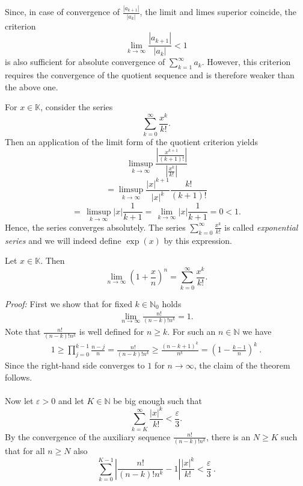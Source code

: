\begin{Remark}{}
Since, in case of convergence of $\frac{|a_{k+1}|}{|a_{k}|}$, the limit and limes superior coincide, the criterion
\[\lim_{k\to\infty}\frac{|a_{k+1}|}{|a_{k}|}<1\]
is also sufficient for absolute convergence of $\sum_{k=1}^\infty a_k$. However, this criterion requires the convergence of the quotient sequence and is therefore weaker than the above one.
\end{Remark}


\begin{example}\label{ex:expser}
 For $x\in\mathbb{K}$, consider the series
\[\sum_{k=0}^\infty\frac{x^k}{k!}.\]
Then an application of the limit form of the quotient criterion yields
$$
\,\limsup_{k \rightarrow \infty}\frac{\left|\frac{x^{k+1}}{(k+1)!}\right|}{\left|\frac{x^k}{k!}\right|}
$$
$$
=\limsup_{k \rightarrow \infty}\frac{|x|^{k+1}}{|x|^k}\frac{k!}{(k+1)!}
$$
$$
=\,\limsup_{k \rightarrow \infty}|x|\frac1{k+1} =\,\lim_{k\to\infty}|x|\frac1{k+1}=0<1.
$$
Hence, the series converges absolutely. The series $\sum_{k=0}^\infty\frac{x^k}{k!}$ is called \emph{exponential series} and we will indeed define $\exp(x)$ by this expression.
\end{example}

\begin{Theorem}{}
Let $x\in\mathbb{K}$. Then
$$
\lim_{n\rightarrow\infty}\left(1+\frac{x}{n}\right)^{n} = \sum_{k=0}^{\infty}\frac{x^{k}}{k!}.
$$
\end{Theorem}
{\em Proof:}
First we show that for fixed $k\in\mathbb{N}_0$ holds
\begin{eqnarray}\label{seqexp}
 \lim_{n\rightarrow \infty} \frac{n!}{(n-k)!n^k} = 1.
\end{eqnarray}\label{seqexp2}
Note that $\frac{n!}{(n-k)!n^k}$ is well defined for $n\geq k$. For such an $n\in\mathbb{N}$ we have
\begin{eqnarray}
  1\geq \prod_{j=0}^{k-1} \frac{n-j}{n} = \frac{n!}{(n-k)!n^k}\geq \frac{(n-k+1)^k}{n^k}=(1-\frac{k-1}{n})^k \ .
\end{eqnarray}
Since the right-hand side converges to $1$ for $n\rightarrow \infty$, the claim of the theorem follows.
\\ \\
Now let $\varepsilon>0$ and let $K\in\mathbb{N}$ be big enough such that 
$$
\sum_{k=K}^{\infty}\frac{|x|^{k}}{k!}<\frac{\varepsilon}{3}.
$$
By the convergence of the auxiliary sequence $\frac{n!}{(n-k)!n^k}$, there is an $N\geq K$ such that for all $n\geq N$ also
$$\sum_{k=0}^{K-1}\left|\frac{n!}{(n-k)!n^k}-1\right|\frac{|x|^{k}}{k!} <\frac{\varepsilon}{3} \ . $$

